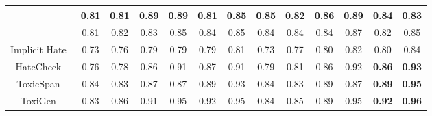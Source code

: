 \begin{table*}[ht]
\begin{tabular}{||c|c|c|c|c|c|c||c|c|c|c|c|c||}
\citeauthor{davidson2017automated}\cite{davidson2017automated} & 0.81 & 0.81 & 0.89 & 0.89 & 0.81 & 0.85 
                             & 0.85 & 0.82 & 0.86 & 0.89 & \textbf{0.84} & 0.83 \\ \hline
                             
\citeauthor{founta2018large}\cite{founta2018large} & 0.81 & 0.82 & 0.83 & 0.85 & 0.84 & 0.85 
                       & 0.84 & 0.84 & 0.84 & 0.87 & 0.82 & 0.85 \\ \hline
                       
Implicit Hate~\cite{elsherief-etal-2021-latent} & 0.73 & 0.76 & 0.79 & 0.79 & 0.79 & 0.81 & 0.73 & 0.77 & 0.80 & 0.82 & 0.80 & 0.84 \\ \hline

HateCheck~\cite{rottger-etal-2021-hatecheck} & 0.76 & 0.78 & 0.86 & 0.91 & 0.87 & 0.91 & 0.79 & 0.81 & 0.86 & 0.92 & \textbf{0.86} & \textbf{0.93} \\ \hline

ToxicSpan~\cite{pavlopoulos-etal-2022-acl} & 0.84 & 0.83 & 0.87 & 0.87 & 0.89 & 0.93 & 0.84 & 0.83 & 0.89 & 0.87 & \textbf{0.89} & \textbf{0.95} \\ \hline

ToxiGen~\cite{hartvigsen-etal-2022-toxigen} & 0.83 & 0.86 & 0.91 & 0.95 & 0.92 & 0.95 & 0.84 & 0.85 & 0.89 & 0.95 & \textbf{0.92} & \textbf{0.96} \\ \hline


\end{tabular}
\end{table*}




